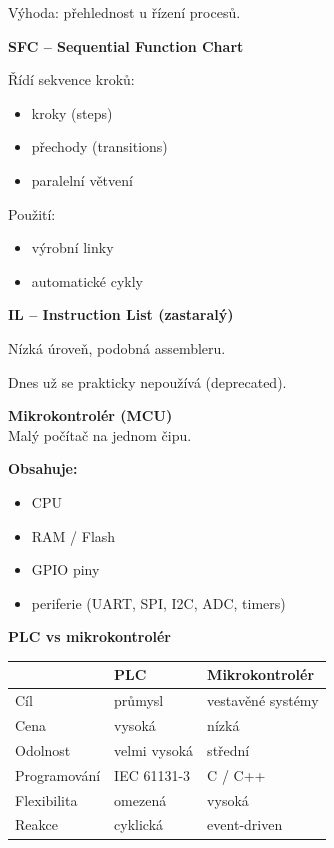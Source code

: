 \documentclass[a4paper,10pt]{article}
\begin{document}
\begin{vysvetlenibox}
Výhoda: přehlednost u řízení procesů.

\textbf{SFC – Sequential Function Chart}

Řídí sekvence kroků:

\begin{itemize}
\item kroky (steps)
\item přechody (transitions)
\item paralelní větvení
\end{itemize}

Použití:
\begin{itemize}
\item výrobní linky
\item automatické cykly
\end{itemize}

\textbf{IL – Instruction List (zastaralý)}

Nízká úroveň, podobná assembleru.

Dnes už se prakticky nepoužívá (deprecated).


\textbf{Mikrokontrolér (MCU)}\\
Malý počítač na jednom čipu.

\textbf{Obsahuje:}
\begin{itemize}
\item CPU
\item RAM / Flash
\item GPIO piny
\item periferie (UART, SPI, I2C, ADC, timers)
\end{itemize}

\textbf{PLC vs mikrokontrolér}

\begin{tabularx}{\linewidth}{l X X}
\toprule
 & PLC & Mikrokontrolér \\
\midrule
Cíl & průmysl & vestavěné systémy \\
Cena & vysoká & nízká \\
Odolnost & velmi vysoká & střední \\
Programování & IEC 61131-3 & C / C++ \\
Flexibilita & omezená & vysoká \\
Reakce & cyklická & event-driven \\
\bottomrule
\end{tabularx}


\end{vysvetlenibox}
\end{document}
